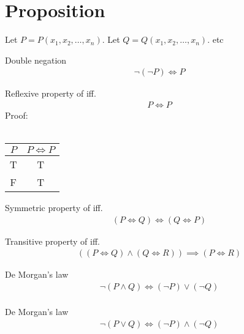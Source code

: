 \section{Proposition}
Let $P = P(x_1, x_2, \dots, x_n)$.
Let $Q = Q(x_1, x_2, \dots, x_n)$.
etc

\begin{prop}
\label{Proposition:double_negation}
Double negation
\begin{align*}
\lnot (\lnot P) \iff P
\end{align*} 
\end{prop}

\begin{prop}
\label{Proposition:iff_reflexive}
Reflexive property of iff.
\begin{align*}
P \iff P
\end{align*} 
Proof: \\ \\
\begin{tabular}{|c|c|}
\hline
$P$ & $P \iff P$ \\
\hline
T & T \\
\hline
F & T \\
\hline
\end{tabular}
\end{prop}

\begin{prop}
\label{Proposition:iff_symmetric}
Symmetric property of iff.
\begin{align*}
(P \iff Q) \iff (Q \iff P) 
\end{align*} 
\end{prop}

\begin{prop}
\label{Proposition:iff_Transitive}
Transitive property of iff.
\begin{align*}
((P \iff Q) \land (Q \iff R)) \implies (P \iff R)
\end{align*} 
\end{prop}

\begin{prop}
\label{Proposition:De_Morgan_1}
De Morgan's law
\begin{align*}
\lnot (P \land Q) \iff (\lnot P) \lor (\lnot Q) \\
\end{align*}
\end{prop}

\begin{prop}
\label{Proposition:De_Morgan_2}
De Morgan's law
\begin{align*}
\lnot (P \lor Q) \iff (\lnot P) \land (\lnot Q) \\
\end{align*}
\end{prop}
